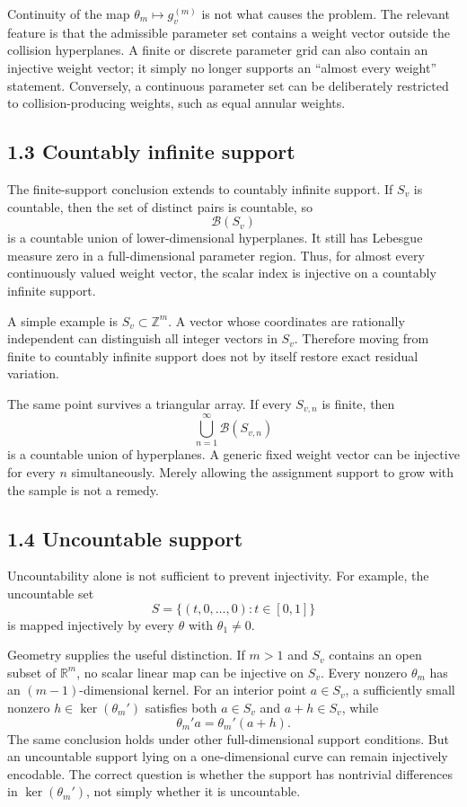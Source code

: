 \documentclass[11pt]{article}
\newcommand{\R}{\mathbb{R}}
\begin{document}
Continuity of the map \(\theta_m\mapsto g_v^{(m)}\) is not what causes the
problem. The relevant feature is that the admissible parameter set contains a
weight vector outside the collision hyperplanes. A finite or discrete
parameter grid can also contain an injective weight vector; it simply no
longer supports an ``almost every weight'' statement. Conversely, a continuous
parameter set can be deliberately restricted to collision-producing weights,
such as equal annular weights.

\subsection*{1.3 Countably infinite support}

The finite-support conclusion extends to countably infinite support. If \(S_v\)
is countable, then the set of distinct pairs is countable, so
\[
    \mathcal B(S_v)
\]
is a countable union of lower-dimensional hyperplanes. It still has Lebesgue
measure zero in a full-dimensional parameter region. Thus, for almost every
continuously valued weight vector, the scalar index is injective on a
countably infinite support.

A simple example is \(S_v\subset\mathbb Z^m\). A vector whose coordinates are
rationally independent can distinguish all integer vectors in \(S_v\).
Therefore moving from finite to countably infinite support does not by itself
restore exact residual variation.

The same point survives a triangular array. If every \(S_{v,n}\) is finite,
then
\[
    \bigcup_{n=1}^{\infty}\mathcal B(S_{v,n})
\]
is a countable union of hyperplanes. A generic fixed weight vector can be
injective for every \(n\) simultaneously. Merely allowing the assignment
support to grow with the sample is not a remedy.

\subsection*{1.4 Uncountable support}

Uncountability alone is not sufficient to prevent injectivity. For example,
the uncountable set
\[
    S=\{(t,0,\ldots,0):t\in[0,1]\}
\]
is mapped injectively by every \(\theta\) with \(\theta_1\neq0\).

Geometry supplies the useful distinction. If \(m>1\) and \(S_v\) contains an
open subset of \(\R^m\), no scalar linear map can be injective on \(S_v\).
Every nonzero \(\theta_m\) has an \((m-1)\)-dimensional kernel. For an interior
point \(a\in S_v\), a sufficiently small nonzero \(h\in\ker(\theta_m')\)
satisfies both \(a\in S_v\) and \(a+h\in S_v\), while
\[
    \theta_m'a=\theta_m'(a+h).
\]
The same conclusion holds under other full-dimensional support conditions.
But an uncountable support lying on a one-dimensional curve can remain
injectively encodable. The correct question is whether the support has
nontrivial differences in \(\ker(\theta_m')\), not simply whether it is
uncountable.
\end{document}
